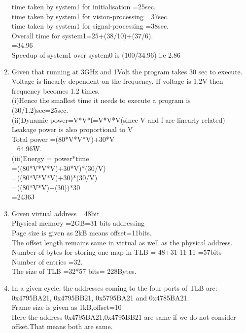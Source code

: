 \documentclass[12pt]{article}
\begin{document}
\begin{enumerate}
time taken by system1 for initialisation =25sec.\\
time taken by system1 for vision-processing =37sec.\\
time taken by system1 for signal-processing =38sec.\\
Overall time for system1=25+(38/10)+(37/6).\\
=34.96\\
Speedup of system1 over system0 is (100/34.96) i.e 2.86\\
\item 
	Given that running at 3GHz and 1Volt the program takes 30 sec to execute. Voltage is linearly dependent on the frequency. If voltage is 1.2V then frequency becomes 1.2 times.\\
	(i)Hence the smallest time it needs to execute a program is (30/1.2)sec=25sec.\\
	(ii)Dynamic power=V*V*f=V*V*V(since V and f are linearly related)\\
	Leakage power is also proportional to V\\
	Total power =(80*V*V*V)+30*V\\
				=64.96W.\\
	(iii)Energy = power*time\\
    	=((80*V*V*V)+30*V)*(30/V)\\
    	=((80*V*V*V)+30)*(30/V)\\
    	=((80*V*V)+(30))*30\\
    	=2436J
\item 
Given virtual address =48bit\\
Physical memory =2GB=31 bits addressing\\
Page size is given as 2kB means offset=11bits.\\
The offset length remains same in virtual as well as the physical address.\\
Number of bytes for storing one map in TLB = 48+31-11-11 =57bits \\
Number of entries =32.\\
The size of TLB =32*57 bits= 228Bytes.\\
\item 
In a given cycle, the addresses coming to the four ports of TLB are:\\
0x4795BA21, 0x4795BB21, 0x5795BA21 and 0x4785BA21.\\
Frame size is given as 1kB,offset=10\\
Here the address 0x4795BA21,0x4795BB21 are same if we do not consider offset.That means both are same.\\

\end{enumerate}
\end{document}

